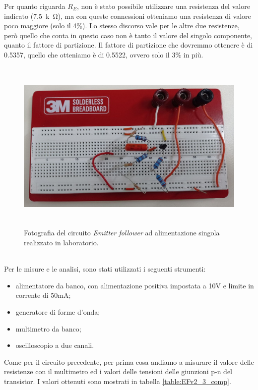 \documentclass{report}
\begin{document}
Per quanto riguarda $R_E$, non è stato possibile utilizzare una resistenza del valore indicato (\SI{7.5}{k\ohm}), ma con queste connessioni otteniamo una resistenza di valore poco maggiore (solo il 4\%). Lo stesso discorso vale per le altre due resistenze, però quello che conta in questo caso non è tanto il valore del singolo componente, quanto il fattore di partizione. Il fattore di partizione che dovremmo ottenere è di 0.5357, quello che otteniamo è di 0.5522, ovvero solo il 3\% in più.
\begin{figure}[h]
\centering
\includegraphics[height=8.5cm]{immagini/fotoEFv2_3}
\caption{Fotografia del circuito \textit{Emitter follower} ad alimentazione singola realizzato in laboratorio.}
\label{figura:fotoEFv2_3}
\end{figure}
\\Per le misure e le analisi, sono stati utilizzati i seguenti strumenti:
\begin{itemize}
\item alimentatore da banco, con alimentazione positiva impostata a 10V e limite in corrente di 50mA;
\item generatore di forme d'onda;
\item multimetro da banco;
\item oscilloscopio a due canali.
\end{itemize}
Come per il circuito precedente, per prima cosa andiamo a misurare il valore delle resistenze con il multimetro ed i valori delle tensioni delle giunzioni p-n del transistor. I valori ottenuti sono mostrati in tabella \ref{table:EFv2_3_comp}.
\\
\end{document}
